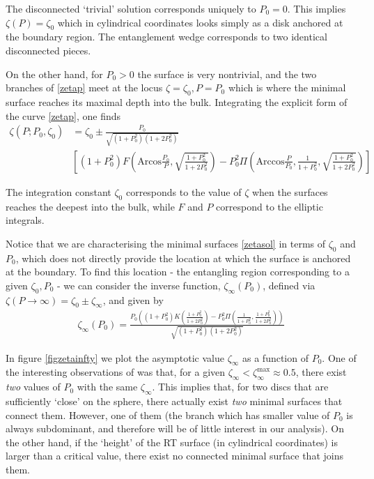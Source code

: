 The disconnected `trivial' solution corresponds uniquely to $P_0=0$. This implies $\zeta(P)=\zeta_0$ which in cylindrical coordinates looks simply as a disk anchored at the boundary region. The entanglement wedge corresponds to two identical disconnected pieces.

On the other hand, for $P_0>0$ the surface is very nontrivial, and the two branches of \eqref{zetap} meet at the locus $\zeta=\zeta_0,P=P_0$ which is where the minimal surface reaches its maximal depth into the bulk. Integrating the explicit form of the curve \eqref{zetap}, one finds
\begin{align}\label{zetasol}
\zeta(P;P_0,\zeta_0)&=\zeta_0\pm \frac{P_0}{\sqrt{(1+P_0^2)(1+2P_0^2)}} \nonumber \\
&\left[ (1+P_0^2) F\left( \mbox{Arcos} \frac{P_0}{P},\sqrt{\frac{1+P_0^2}{1+2P_0^2}} \right)-P_0^2 \Pi\left( \mbox{Arccos}\frac{P}{P_0},\frac{1}{1+P_0^2},\sqrt{\frac{1+P_0^2}{1+2P_0^2}} \right) \right]
\end{align}

The integration constant $\zeta_0$ corresponds to the value of $\zeta$ when the surfaces reaches the deepest into the bulk, while $F$ and $P$ correspond to the elliptic integrals.


Notice that we are characterising the minimal surfaces \eqref{zetasol} in terms of $\zeta_0$ and $P_0$, which does not directly provide the location at which the surface is anchored at the boundary.  To find this location - the entangling region corresponding to a given $\zeta_0,P_0$ - we can consider the inverse function, $\zeta_\infty(P_0)$, defined via $\zeta(P\to \infty)=\zeta_0\pm \zeta_\infty$, and given by
\begin{align}\label{}
\zeta_{\infty}(P_0)=\frac{P_0\left( (1+P_0^2)K\left( \frac{1+P_0^2}{1+2P_0^2} \right) - P_0^2 \Pi \left( \frac{1}{1+P_0^2},\frac{1+P_0^2}{1+2P_0^2} \right) \right)}{\sqrt{(1+P_0^2)(1+2P_0^2)}}
\end{align}

In figure \ref{figzetainfty} we plot the asymptotic value $\zeta_\infty$ as a function of $P_0$. One of the interesting observations of \cite{Krtous:2014pva} was that, for a given $\zeta_\infty<\zeta_\infty^{\text{max}}\approx 0.5$, there exist \textit{two} values of $P_0$ with the same $\zeta_\infty$. This implies that, for two discs that are sufficiently `close' on the sphere, there actually exist \textit{two} minimal surfaces that connect them. However, one of them (the branch which has smaller value of $P_0$ is always subdominant, and therefore will be of little interest in our analysis). On the other hand, if the `height' of the RT surface (in cylindrical coordinates) is larger than a critical value, there exist no connected minimal surface that joins them.

